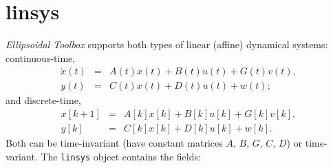 \documentclass{report}
\begin{document}
\section{linsys}
{\it Ellipsoidal Toolbox}  supports both types of linear (affine)
dynamical systems: continuous-time,
\begin{eqnarray*}
\dot{x}(t) & = & A(t)x(t) + B(t)u(t) + G(t)v(t),\\
y(t) & = & C(t)x(t) + D(t)u(t) + w(t);
\end{eqnarray*}
and discrete-time,
\begin{eqnarray*}
x[k+1] & = & A[k]x[k] + B[k]u[k] + G[k]v[k], \\
y[k] & = & C[k]x[k] + D[k]u[k] + w[k].
\end{eqnarray*}
Both can be time-invariant (have constant matrices $A$, $B$, $G$, $C$, $D$)
or time-variant.
\newline
The {\tt linsys} object contains the fields:
\end{document}
